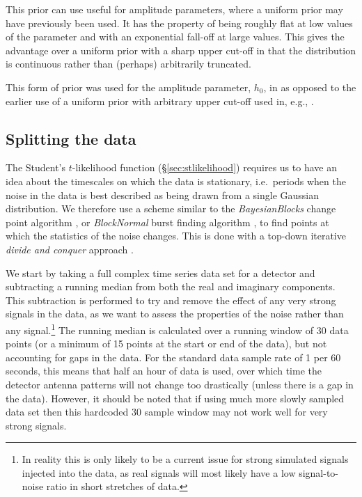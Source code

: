 This prior can use useful for amplitude parameters, where a uniform prior may have previously been used. It has the property of being roughly
flat at low values of the parameter and with an exponential fall-off at large values. This gives the advantage over a uniform prior with a
sharp upper cut-off in that the distribution is continuous rather than (perhaps) arbitrarily truncated.

This form of prior was used for the \gw amplitude parameter, $h_0$, in \citet{2017arXiv170107709T} as opposed to the earlier use of
a uniform prior with arbitrary upper cut-off used in, e.g., \citet{2014ApJ...785..119A}.

\subsection{Splitting the data}\label{sec:splitting}

The Student's $t$-likelihood function (\S\ref{sec:stlikelihood}) requires us to have an idea about the timescales on which the data is
stationary, i.e.\ periods when the noise in the data is best described as being drawn from a single
Gaussian distribution. We therefore use a scheme similar to the {\it BayesianBlocks} change point algorithm
\citep{1998ApJ...504..405S}, or {\it BlockNormal} \gw burst finding algorithm \citep{2004CQGra..21S1705M}, to find points at which the statistics of the
noise changes. This is done with a top-down iterative {\it divide and conquer} approach \citep{2000physics...9033S}.

We start by taking a full complex time series data set for a detector and subtracting a running median from both
the real and imaginary components. This
subtraction is performed to try and remove the effect of any very strong signals in the data, as we want to
assess the properties of the noise rather than any signal.\footnote{In reality this is only likely to be a current issue for strong
simulated signals injected into the data, as real signals will most likely have a low signal-to-noise ratio in short stretches of data.} The running median is calculated over a running window
of 30 data points (or a minimum of 15 points at the start or end of the data), but not accounting for gaps in the data.
For the standard data sample rate of
1 per 60 seconds, this means that half an hour of data is used, over which time the detector antenna patterns will not change
too drastically (unless there is a gap in the data). However, it should be noted that if using much more slowly sampled data set
then this hardcoded 30 sample window may not work well for very strong signals.

